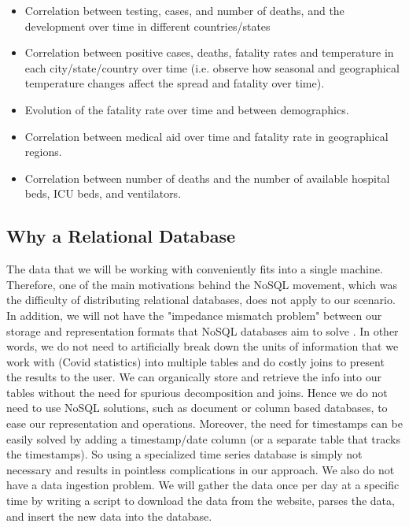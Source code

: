 \documentclass[11pt]{article}
\begin{document}
\begin{itemize}
    \item Correlation between testing, cases, and number of deaths, and the development over time in different countries/states
    \item Correlation between positive cases, deaths, fatality rates and temperature in each city/state/country over time (i.e. observe how seasonal and geographical temperature changes affect the spread and fatality over time).
    \item Evolution of the fatality rate over time and between demographics.
    \item Correlation between medical aid over time and fatality rate in geographical regions.
    \item Correlation between number of deaths and the number of available hospital beds, ICU beds, and ventilators.
\end{itemize}

\subsection{Why a Relational Database}



\noindent
The data that we will be working with conveniently fits into a single machine. Therefore, one of the main motivations behind the NoSQL movement, which was the difficulty of distributing relational databases, does not apply to our scenario. In addition, we will not have the "impedance mismatch problem" between our storage and representation formats that NoSQL databases aim to solve \cite{nosqlTalk}. In other words, we do not need to artificially break down the units of information that we work with (Covid statistics) into multiple tables and do costly joins to present the results to the user. We can organically store and retrieve the info into our tables without the need for spurious decomposition and joins. Hence we do not need to use NoSQL solutions, such as document or column based databases, to ease our representation and operations. Moreover, the need for timestamps can be easily solved by adding a timestamp/date column (or a separate table that tracks the timestamps). So using a specialized time series database is simply not necessary and results in pointless complications in our approach. We also do not have a data ingestion problem. We will gather the data once per day at a specific time by writing a script to download the data from the website, parses the data, and insert the new data into the database. \\
\end{document}
